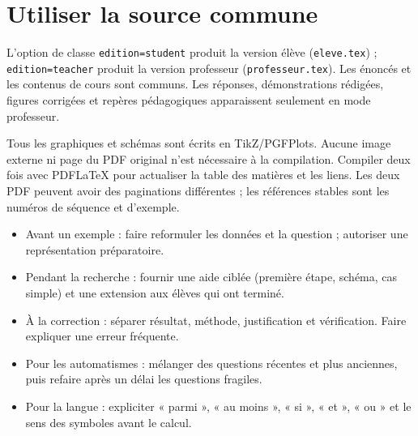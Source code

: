 \section*{Utiliser la source commune}
\begin{keypoint}
L'option de classe \texttt{edition=student} produit la version élève (\texttt{eleve.tex}) ; \texttt{edition=teacher} produit la version professeur (\texttt{professeur.tex}). Les énoncés et les contenus de cours sont communs. Les réponses, démonstrations rédigées, figures corrigées et repères pédagogiques apparaissent seulement en mode professeur.
\end{keypoint}
Tous les graphiques et schémas sont écrits en TikZ/PGFPlots. Aucune image externe ni page du PDF original n'est nécessaire à la compilation. Compiler deux fois avec PDFLaTeX pour actualiser la table des matières et les liens. Les deux PDF peuvent avoir des paginations différentes ; les références stables sont les numéros de séquence et d'exemple.
\begin{method}
\begin{itemize}
\item Avant un exemple : faire reformuler les données et la question ; autoriser une représentation préparatoire.
\item Pendant la recherche : fournir une aide ciblée (première étape, schéma, cas simple) et une extension aux élèves qui ont terminé.
\item À la correction : séparer résultat, méthode, justification et vérification. Faire expliquer une erreur fréquente.
\item Pour les automatismes : mélanger des questions récentes et plus anciennes, puis refaire après un délai les questions fragiles.
\item Pour la langue : expliciter « parmi », « au moins », « si », « et », « ou » et le sens des symboles avant le calcul.
\end{itemize}
\end{method}
